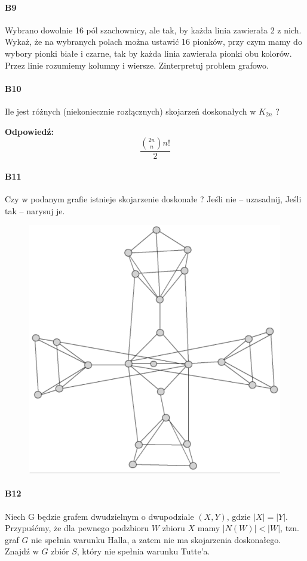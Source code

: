 \paragraph{B9} Wybrano dowolnie 16 pól szachownicy, ale tak, by każda linia zawierała 2 z nich. Wykaż, że na wybranych polach można ustawić 16 pionków, przy czym mamy do wybory pionki białe i czarne, tak by każda linia zawierała pionki obu kolorów. Przez linie rozumiemy kolumny i wiersze. Zinterpretuj problem grafowo.

\paragraph{B10} Ile jest różnych (niekoniecznie rozłącznych) skojarzeń doskonałych w $K_{2n}$ ?

\textbf{Odpowiedź:}
$$\frac{\binom{2n}{n}n!}{2}$$
\paragraph{B11} Czy w podanym grafie istnieje skojarzenie doskonałe ? Jeśli nie – uzasadnij, Jeśli tak – narysuj je.
\begin{figure}[H]
\centering
\includegraphics[width=.9\textwidth]{img/2_B11}
\end{figure}

\paragraph{B12} Niech G będzie grafem dwudzielnym o dwupodziale $(X, Y )$, gdzie $|X| = |Y |$. Przypuśćmy, że dla pewnego podzbioru $W$ zbioru $X$ mamy $|N(W)| < |W|$, tzn. graf $G$ nie spełnia warunku Halla, a zatem nie ma skojarzenia doskonałego. Znajdź w $G$ zbiór $S$, który nie spełnia warunku Tutte’a.

